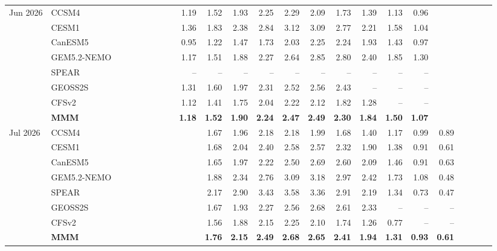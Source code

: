 \documentclass{article}
\begin{document}
\begin{longtable}{llrrrrrrrrrrrrrrrrrrrrrr}
\midrule
Jun 2026 & CCSM4 &  &  &  &  &  &  &  & 1.19 & 1.52 & 1.93 & 2.25 & 2.29 & 2.09 & 1.73 & 1.39 & 1.13 & 0.96 &  &  &  &  &  \\
 & CESM1 &  &  &  &  &  &  &  & 1.36 & 1.83 & 2.38 & 2.84 & 3.12 & 3.09 & 2.77 & 2.21 & 1.58 & 1.04 &  &  &  &  &  \\
 & CanESM5 &  &  &  &  &  &  &  & 0.95 & 1.22 & 1.47 & 1.73 & 2.03 & 2.25 & 2.24 & 1.93 & 1.43 & 0.97 &  &  &  &  &  \\
 & GEM5.2-NEMO &  &  &  &  &  &  &  & 1.17 & 1.51 & 1.88 & 2.27 & 2.64 & 2.85 & 2.80 & 2.40 & 1.85 & 1.30 &  &  &  &  &  \\
 & SPEAR &  &  &  &  &  &  &  & -- & -- & -- & -- & -- & -- & -- & -- & -- & -- &  &  &  &  &  \\
 & GEOSS2S &  &  &  &  &  &  &  & 1.31 & 1.60 & 1.97 & 2.31 & 2.52 & 2.56 & 2.43 & -- & -- & -- &  &  &  &  &  \\
 & CFSv2 &  &  &  &  &  &  &  & 1.12 & 1.41 & 1.75 & 2.04 & 2.22 & 2.12 & 1.82 & 1.28 & -- & -- &  &  &  &  &  \\
 & \textbf{MMM} &  &  &  &  &  &  &  & \textbf{1.18} & \textbf{1.52} & \textbf{1.90} & \textbf{2.24} & \textbf{2.47} & \textbf{2.49} & \textbf{2.30} & \textbf{1.84} & \textbf{1.50} & \textbf{1.07} &  &  &  &  &  \\
\midrule
Jul 2026 & CCSM4 &  &  &  &  &  &  &  &  & 1.67 & 1.96 & 2.18 & 2.18 & 1.99 & 1.68 & 1.40 & 1.17 & 0.99 & 0.89 &  &  &  &  \\
 & CESM1 &  &  &  &  &  &  &  &  & 1.68 & 2.04 & 2.40 & 2.58 & 2.57 & 2.32 & 1.90 & 1.38 & 0.91 & 0.61 &  &  &  &  \\
 & CanESM5 &  &  &  &  &  &  &  &  & 1.65 & 1.97 & 2.22 & 2.50 & 2.69 & 2.60 & 2.09 & 1.46 & 0.91 & 0.63 &  &  &  &  \\
 & GEM5.2-NEMO &  &  &  &  &  &  &  &  & 1.88 & 2.34 & 2.76 & 3.09 & 3.18 & 2.97 & 2.42 & 1.73 & 1.08 & 0.48 &  &  &  &  \\
 & SPEAR &  &  &  &  &  &  &  &  & 2.17 & 2.90 & 3.43 & 3.58 & 3.36 & 2.91 & 2.19 & 1.34 & 0.73 & 0.47 &  &  &  &  \\
 & GEOSS2S &  &  &  &  &  &  &  &  & 1.67 & 1.93 & 2.27 & 2.56 & 2.68 & 2.61 & 2.33 & -- & -- & -- &  &  &  &  \\
 & CFSv2 &  &  &  &  &  &  &  &  & 1.56 & 1.88 & 2.15 & 2.25 & 2.10 & 1.74 & 1.26 & 0.77 & -- & -- &  &  &  &  \\
 & \textbf{MMM} &  &  &  &  &  &  &  &  & \textbf{1.76} & \textbf{2.15} & \textbf{2.49} & \textbf{2.68} & \textbf{2.65} & \textbf{2.41} & \textbf{1.94} & \textbf{1.31} & \textbf{0.93} & \textbf{0.61} &  &  &  &  \\

\end{longtable}
\end{document}
